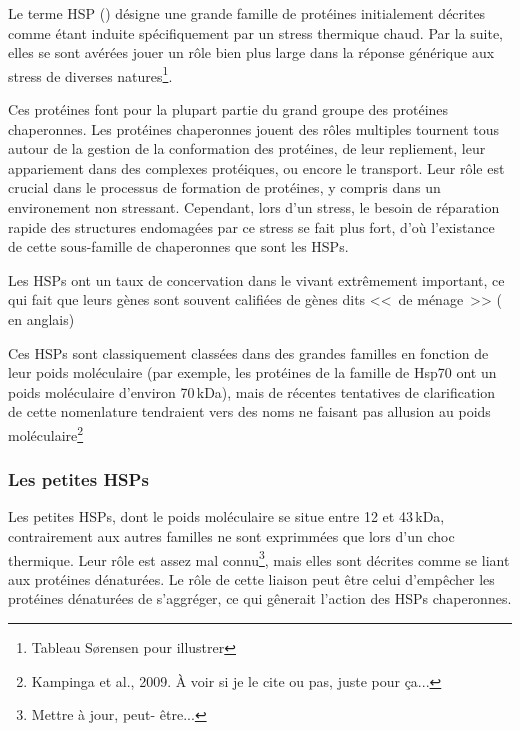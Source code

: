\cite{federhoffmann1999, zhang2011}

Le terme HSP () désigne une grande famille de
protéines initialement décrites comme étant induite spécifiquement par un
stress thermique chaud. Par la suite, elles se sont avérées jouer un rôle bien
plus large dans la réponse générique aux stress de diverses
natures\cite{sorensen2003}\footnote{Tableau Sørensen pour illustrer}.


Ces protéines font pour la plupart partie du grand groupe des protéines chaperonnes. Les
protéines chaperonnes jouent des rôles multiples tournent tous autour de la
gestion de la conformation des protéines, de leur repliement, leur appariement
dans des complexes protéiques, ou encore le transport.  Leur rôle est crucial
dans le processus de formation de protéines, y compris dans un environement
non stressant. Cependant, lors d'un stress, le besoin de réparation rapide des
structures endomagées par ce stress se fait plus fort, d'où l'existance de
cette sous-famille de chaperonnes que sont les HSPs.


Les HSPs ont un taux de concervation dans le vivant extrêmement important, ce
qui fait que leurs gènes sont souvent califiées de gènes dits <<~de ménage~>>
( en anglais)


Ces HSPs sont classiquement classées dans des grandes familles en fonction de
leur poids moléculaire \cite{fink1999} (par exemple, les protéines de la
famille de Hsp70 ont un poids moléculaire d'environ 70\,kDa), mais de récentes
tentatives de clarification de cette nomenlature tendraient vers des noms ne
faisant pas allusion au poids moléculaire\footnote{Kampinga et al., 2009. À
voir si je le cite ou pas, juste pour ça...}

\subsubsection{Les petites HSPs} %
\label{ssub:les_petites_hsps}

  Les petites HSPs, dont le poids moléculaire se situe entre 12 et 43\,kDa,
  contrairement aux autres familles ne sont exprimmées que lors d'un choc
  thermique. Leur rôle est assez mal connu\footnote{Mettre à jour, peut-
  être...}, mais elles sont décrites comme se liant aux protéines dénaturées.
  Le rôle de cette liaison peut être celui d'empêcher les protéines dénaturées
  de s'aggréger, ce qui gênerait l'action des HSPs chaperonnes.


